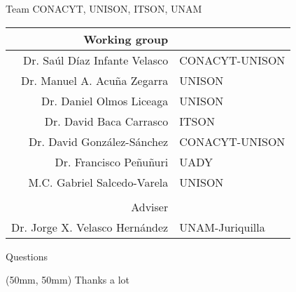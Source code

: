 \begin{frame}{Team CONACYT, UNISON, ITSON, UNAM }
    \begin{center}
        \begin{tabular}{rl}
            Working group
            \\
            \midrule
            Dr. Saúl Díaz Infante Velasco
            &
                CONACYT-UNISON
            \\
            Dr. Manuel A. Acu\~na Zegarra
            &
                UNISON
            \\
            Dr. Daniel Olmos Liceaga
            &
                UNISON
            \\
            Dr. David Baca Carrasco
            &
                ITSON
           \\
           Dr. David Gonz\'alez-S\'anchez
            &
            CONACYT-UNISON
           \\
           Dr. Francisco Pe\~nu\~nuri
           & UADY
           \\
            M.C. Gabriel Salcedo-Varela
            & UNISON
            \\
            \\
           Adviser
           \\
           \midrule
            Dr. Jorge X. Velasco Hern\'andez
            &
            UNAM-Juriquilla
            
        \end{tabular}
    \end{center}
\end{frame}
\begin{frame}{Questions}
    \begin{textblock*}{90mm}(50mm, 50mm)
        \Huge{Thanks a lot}
    \end{textblock*}
\end{frame}
